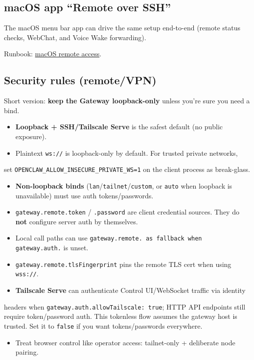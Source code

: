 \subsection{macOS app “Remote over SSH”}


The macOS menu bar app can drive the same setup end-to-end (remote status checks, WebChat, and Voice Wake forwarding).

Runbook: \href{/platforms/mac/remote}{macOS remote access}.

\subsection{Security rules (remote/VPN)}


Short version: \textbf{keep the Gateway loopback-only} unless you’re sure you need a bind.

\begin{itemize}
  \item \textbf{Loopback + SSH/Tailscale Serve} is the safest default (no public exposure).
  \item Plaintext \texttt{ws://} is loopback-only by default. For trusted private networks,
\end{itemize}

set \texttt{OPENCLAW\_ALLOW\_INSECURE\_PRIVATE\_WS=1} on the client process as break-glass.
\begin{itemize}
  \item \textbf{Non-loopback binds} (\texttt{lan}/\texttt{tailnet}/\texttt{custom}, or \texttt{auto} when loopback is unavailable) must use auth tokens/passwords.
  \item \texttt{gateway.remote.token} / \texttt{.password} are client credential sources. They do \textbf{not} configure server auth by themselves.
  \item Local call paths can use \texttt{gateway.remote.\textit{} as fallback when \texttt{gateway.auth.}} is unset.
  \item \texttt{gateway.remote.tlsFingerprint} pins the remote TLS cert when using \texttt{wss://}.
  \item \textbf{Tailscale Serve} can authenticate Control UI/WebSocket traffic via identity
\end{itemize}

headers when \texttt{gateway.auth.allowTailscale: true}; HTTP API endpoints still
require token/password auth. This tokenless flow assumes the gateway host is
trusted. Set it to \texttt{false} if you want tokens/passwords everywhere.
\begin{itemize}
  \item Treat browser control like operator access: tailnet-only + deliberate node pairing.
\end{itemize}


